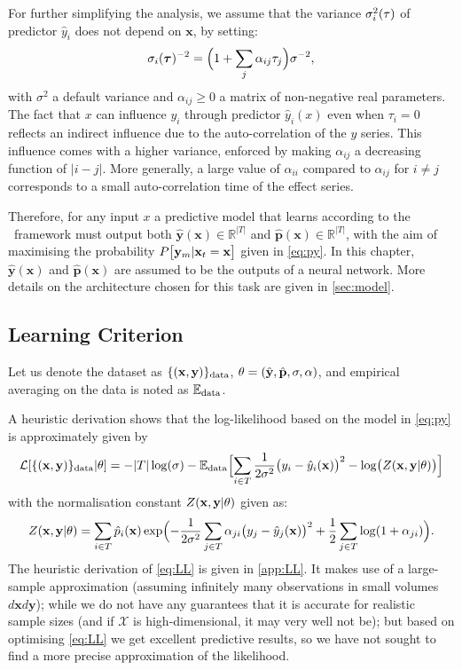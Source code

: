For further simplifying the analysis, we assume that the variance $\sigma_i^2({\bf \tau})$ of 
predictor $\hat y_i$ does not depend on $\mathbf{x}$, by setting:
\[
\sigma_i(\boldsymbol{\tau})^{-2} = \Bigl(1+\sum_j\alpha_{ij} \tau_j\Bigr)\sigma^{-2},
\]
with $\sigma^2$ a default variance and $\alpha_{ij}\ge 0$ a matrix of non-negative real parameters. 
The fact that $x$ can influence $y_i$ through predictor $\hat y_i(x)$ even when $\tau_i=0$ reflects 
an indirect influence due to the auto-correlation of the $y$ series. This influence comes with a 
higher variance, enforced by making $\alpha_{ij}$ a decreasing function of $\vert i-j\vert$. More 
generally, a large value of $\alpha_{ii}$ compared to $\alpha_{ij}$ for $i\ne j$ corresponds to a 
small auto-correlation time of the effect series. 

Therefore, for any input $x$ a predictive model that learns according to the \XX \ framework must 
output both $\hat{\mathbf{y}}(\mathbf{x}) \in \mathbb{R}^{\rvert T \rvert}$ and 
$\hat{\mathbf{p}}(\mathbf{x}) \in \mathbb{R}^{\rvert T \rvert}$, with the aim of maximising the probability 
$P\bigl[{\bf y}_{m}\vert \mathbf{x}_t=\mathbf{x}\bigr]$ given in \cref{eq:py}. In this chapter, 
$\hat{\mathbf{y}}(\mathbf{x})$ and $\hat{\mathbf{p}}(\mathbf{x})$ are assumed to be the outputs of a neural network.
More details on the architecture chosen for this task are given in \cref{sec:model}.

\subsection{Learning Criterion}

Let us denote the dataset as $\{(\mathbf{x},{\bf y})\}_{\rm data}$, 
$\theta = (\hat {\bf y},\hat{\bf p},\sigma,\alpha)$, and empirical averaging on the 
data is noted as ${\mathbb E}_{\rm data}$.

A heuristic derivation shows that the log-likelihood based on the model in \cref{eq:py} is 
approximately given by
%
\begin{equation}\label{eq:LL}
  {\cal L}[\{(\mathbf{x},{\bf y})\}_{\rm data}\vert\theta] = -\vert T\vert\log(\sigma)-{\mathbb E}_{\rm data}
  \Bigl[\sum_{i\in T}\frac{1}{2\sigma^2}\bigl(y_i-\hat y_i(\mathbf{x})\bigr)^2-\log\bigl(Z(\mathbf{x},{\bf y}\vert\theta)\bigr)\Bigr]
\end{equation}
%
with the normalisation constant $Z(\mathbf{x},{\bf y}\vert\theta)$ given as:
\[
Z(\mathbf{x},{\bf y}\vert\theta) = \sum_{i\in T}  \hat p_i(\mathbf{x})\exp\Bigl(-\frac{1}{2\sigma^2}\sum_{j\in T}\alpha_{ji}\bigl(y_j-\hat y_j(\mathbf{x})\bigr)^2+\frac{1}{2}\sum_{j\in T}\log(1+\alpha_{ji})\Bigr).
\]
The heuristic derivation of \cref{eq:LL} is given in \cref{app:LL}. It makes use of a large-sample 
approximation (assuming infinitely many observations in small volumes $d\mathbf{x} d\mathbf{y}$); while we 
do not have any guarantees that it is accurate for realistic sample sizes (and if $\mathcal{X}$ is 
high-dimensional, it may very well not be); but based on optimising \cref{eq:LL} we get 
excellent predictive results, so we have not sought to find a more precise approximation of 
the likelihood.

